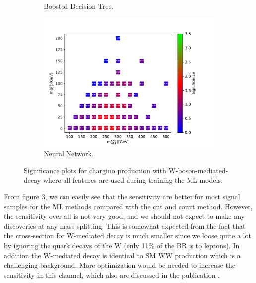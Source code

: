 \begin{figure}[H]
\begin{subfigure}[t!]{0.49\textwidth}
    \caption{Boosted Decision Tree.}
        \label{fig:signAllWWBDT}
    \end{subfigure}      
    \begin{subfigure}[t!]{0.49\textwidth}
    \includegraphics[width = \textwidth]{Figures/Significances/significance_NN_WW_All_level.pdf}
    \caption{Neural Network.}
        \label{fig:signAllWWNN}
    \end{subfigure}
    \caption{Significance plots for chargino production with W-boson-mediated-decay where all features are used during training the ML models.}
    \label{fig:signAllWW}
\end{figure}

From figure \ref{fig:signAllWW}, we can easily see that the sensitivity are better for most signal samples for the ML methods compared with the cut and count method. However, the sensitivity over all is not very good, and we should not expect to make any discoveries at any mass splitting. This is somewhat expected from the fact that the cross-section for W-mediated decay is much smaller since we loose quite a lot by ignoring the quark decays of the W (only 11\% of the BR is to leptons). In addition the W-mediated decay is identical to SM WW production which is a challenging background. More optimization would be needed to increase the sensitivity in this channel, which also are discussed in the publication \cite{sleptonexclusion}.


































